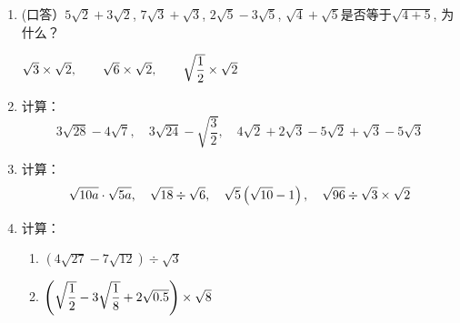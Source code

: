 \begin{ex}
\begin{enumerate}
    \item (口答）$5\sqrt{2}+3\sqrt{2}$, $7\sqrt{3}+\sqrt{3}$, $2\sqrt{5}-3\sqrt{5}$, $\sqrt{4}+\sqrt{5}$是否等于$\sqrt{4+5}$, 为什么？

    $\sqrt{3}\times \sqrt{2},\qquad \sqrt{6}\times \sqrt{2},\qquad \sqrt{\dfrac{1}{2}}\times \sqrt{2}$

    \item 计算：
    \[3\sqrt{28}-4\sqrt{7},\quad 3\sqrt{24}-\sqrt{\frac{3}{2}},\quad 4\sqrt{2}+2\sqrt{3}-5\sqrt{2}+\sqrt{3}-5\sqrt{3}\]

    \item 计算：
    \[\sqrt{10a}\cdot \sqrt{5a},\quad \sqrt{18}\div \sqrt{6},\quad \sqrt{5}\left(\sqrt{10}-1\right),\quad \sqrt{96}\div \sqrt{3}\times \sqrt{2}\]
    \item 计算：
    \begin{enumerate}
        \item $\left(4\sqrt{27}-7\sqrt{12}\right)\div \sqrt{3}$
        \item $\left(\sqrt{\dfrac{1}{2}}-3\sqrt{\dfrac{1}{8}}+2\sqrt{0.5}\right)\times \sqrt{8}$
    \end{enumerate}
\end{enumerate}
\end{ex}

